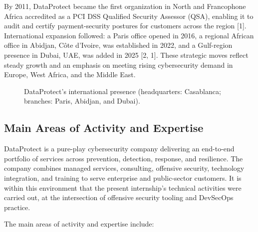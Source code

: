 \documentclass[12pt]{article}
\begin{document}
By 2011, DataProtect became the first organization in North and Francophone
Africa accredited as a PCI DSS Qualified Security Assessor (QSA), enabling it
to audit and certify payment-security postures for customers across the region
[1]. International expansion followed: a Paris office opened in 2016, a
regional African office in Abidjan, C\^ote d'Ivoire, was established in 2022, and
a Gulf-region presence in Dubai, UAE, was added in 2025 [2, 1]. These strategic
moves reflect steady growth and an emphasis on meeting rising cybersecurity
demand in Europe, West Africa, and the Middle East.

\begin{figure}[ht]
\centering
{}
\caption{DataProtect's international presence (headquarters: Casablanca; branches: Paris, Abidjan, and Dubai).}
\label{fig:dataprotect-presence}
\end{figure}

\subsection{Main Areas of Activity and Expertise}

DataProtect is a pure-play cybersecurity company delivering an end-to-end
portfolio of services across prevention, detection, response, and resilience.
The company combines managed services, consulting, offensive security,
technology integration, and training to serve enterprise and public-sector
customers. It is within this environment that the present internship's
technical activities were carried out, at the intersection of offensive
security tooling and DevSecOps practice.

The main areas of activity and expertise include:
\end{document}
